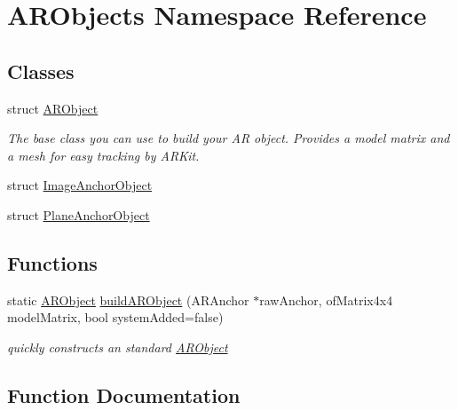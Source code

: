 \hypertarget{namespace_a_r_objects}{}\section{A\+R\+Objects Namespace Reference}
\label{namespace_a_r_objects}
\subsection*{Classes}
\begin{DoxyCompactItemize}
\item 
struct \mbox{\hyperlink{struct_a_r_objects_1_1_a_r_object}{A\+R\+Object}}
\begin{DoxyCompactList}\small\item\em The base class you can use to build your AR object. Provides a model matrix and a mesh for easy tracking by A\+R\+Kit. \end{DoxyCompactList}\item 
struct \mbox{\hyperlink{struct_a_r_objects_1_1_image_anchor_object}{Image\+Anchor\+Object}}
\item 
struct \mbox{\hyperlink{struct_a_r_objects_1_1_plane_anchor_object}{Plane\+Anchor\+Object}}
\end{DoxyCompactItemize}
\subsection*{Functions}
\begin{DoxyCompactItemize}
\item 
static \mbox{\hyperlink{struct_a_r_objects_1_1_a_r_object}{A\+R\+Object}} \mbox{\hyperlink{namespace_a_r_objects_a3721dd2b55c8de28aa62371a1d345a83}{build\+A\+R\+Object}} (A\+R\+Anchor $\ast$raw\+Anchor, of\+Matrix4x4 model\+Matrix, bool system\+Added=false)
\begin{DoxyCompactList}\small\item\em quickly constructs an standard \mbox{\hyperlink{struct_a_r_objects_1_1_a_r_object}{A\+R\+Object}} \end{DoxyCompactList}\end{DoxyCompactItemize}


\subsection{Function Documentation}
\mbox{\label{namespace_a_r_objects_a3721dd2b55c8de28aa62371a1d345a83}} 

